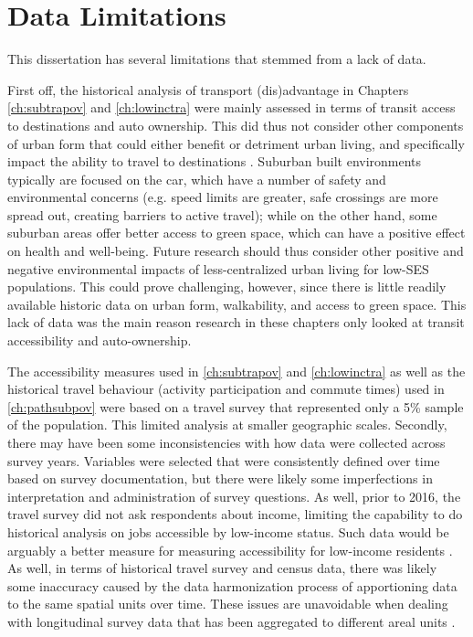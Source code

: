 \section{Data Limitations}

This dissertation has several limitations that stemmed from a lack of data.

First off, the historical analysis of transport (dis)advantage in Chapters \ref{ch:subtrapov} and \ref{ch:lowinctra} were mainly assessed in terms of transit access to destinations and auto ownership. This did thus not consider other components of urban form that could either benefit or detriment urban living, and specifically impact the ability to travel to destinations \cite{ewing_relationship_2003,ewing2014measuring}. Suburban built environments typically are focused on the car, which have a number of safety and environmental concerns (e.g. speed limits are greater, safe crossings are more spread out, creating barriers to active travel); while on the other hand, some suburban areas offer better access to green space, which can have a positive effect on health and well-being. Future research should thus consider other positive and negative environmental impacts of less-centralized urban living for low-SES populations. This could prove challenging, however, since there is little readily available historic data on urban form, walkability, and access to green space. This lack of data was the main reason research in these chapters only looked at transit accessibility and auto-ownership.

The accessibility measures used in \ref{ch:subtrapov} and \ref{ch:lowinctra} as well as the historical travel behaviour (activity participation and commute times) used in \ref{ch:pathsubpov} were based on a travel survey that represented only a 5\% sample of the population. This limited analysis at smaller geographic scales. Secondly, there may have been some inconsistencies with how data were collected across survey years. Variables were selected that were consistently defined over time based on survey documentation, but there were likely some imperfections in interpretation and administration of survey questions. As well, prior to 2016, the travel survey did not ask respondents about income, limiting the capability to do historical analysis on jobs accessible by low-income status. Such data would be arguably a better measure for measuring accessibility for low-income residents \cite{fan_impact_2012,cui_accessibility_2019,allen_sizing_2019}. As well, in terms of historical travel survey and census data, there was likely some inaccuracy caused by the data harmonization process of apportioning data to the same spatial units over time. These issues are unavoidable when dealing with longitudinal survey data that has been aggregated to different areal units \cite{logan_interpolating_2014,allen_new_2018}. 

